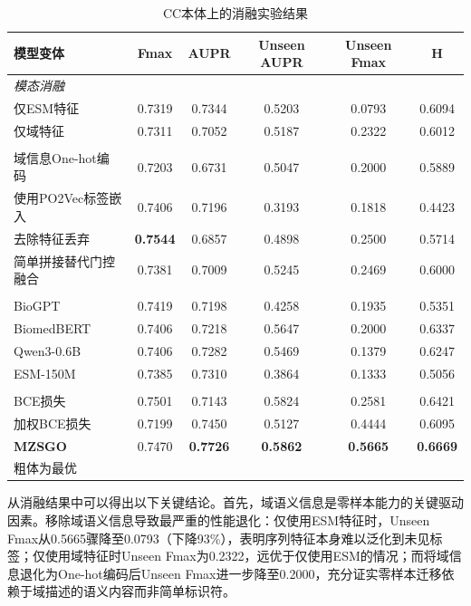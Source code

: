 \begin{table}[htbp]
  \centering
  \caption{CC本体上的消融实验结果}
  \label{tab:mzsgo_ablation}
  \small
    \begin{tabular}{lccccc}
    \toprule
    \textbf{模型变体} & \textbf{Fmax} & \textbf{AUPR} & \textbf{Unseen AUPR} & \textbf{Unseen Fmax} & \textbf{H} \\
    \midrule
    \multicolumn{6}{l}{\textit{模态消融}} \\
    仅ESM特征 & 0.7319 & 0.7344 & 0.5203 & 0.0793 & 0.6094 \\
    仅域特征 & 0.7311 & 0.7052 & 0.5187 & 0.2322 & 0.6012 \\
    \addlinespace[5pt]
    \multicolumn{6}{l}{\textit{特征与架构消融}} \\
    域信息One-hot编码 & 0.7203 & 0.6731 & 0.5047 & 0.2000 & 0.5889 \\
    使用PO2Vec标签嵌入 & 0.7406 & 0.7196 & 0.3193 & 0.1818 & 0.4423 \\
    去除特征丢弃 & \textbf{0.7544} & 0.6857 & 0.4898 & 0.2500 & 0.5714 \\
    简单拼接替代门控融合 & 0.7381 & 0.7009 & 0.5245 & 0.2469 & 0.6000 \\
    \addlinespace[5pt]
    \multicolumn{6}{l}{\textit{编码器变体}} \\
    BioGPT & 0.7419 & 0.7198 & 0.4258 & 0.1935 & 0.5351 \\
    BiomedBERT & 0.7406 & 0.7218 & 0.5647 & 0.2000 & 0.6337 \\
    Qwen3-0.6B & 0.7406 & 0.7282 & 0.5469 & 0.1379 & 0.6247 \\
    ESM-150M & 0.7385 & 0.7310 & 0.3864 & 0.1333 & 0.5056 \\
    \addlinespace[5pt]
    \multicolumn{6}{l}{\textit{损失函数变体}} \\
    BCE损失 & 0.7501 & 0.7143 & 0.5824 & 0.2581 & 0.6421 \\
    加权BCE损失 & 0.7199 & 0.7450 & 0.5127 & 0.4444 & 0.6095 \\
    \addlinespace[5pt]
    \textbf{MZSGO} & 0.7470 & \textbf{0.7726} & \textbf{0.5862} & \textbf{0.5665} & \textbf{0.6669} \\
    \bottomrule
\multicolumn{6}{l}{\vspace{0.2em}\footnotesize 粗体为最优} \\
    \end{tabular}
\end{table}

从消融结果中可以得出以下关键结论。首先，域语义信息是零样本能力的关键驱动因素。移除域语义信息导致最严重的性能退化：仅使用ESM特征时，Unseen Fmax从0.5665骤降至0.0793（下降93\%），表明序列特征本身难以泛化到未见标签；仅使用域特征时Unseen Fmax为0.2322，远优于仅使用ESM的情况；而将域信息退化为One-hot编码后Unseen Fmax进一步降至0.2000，充分证实零样本迁移依赖于域描述的语义内容而非简单标识符。

